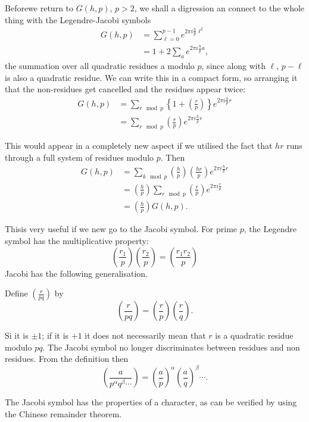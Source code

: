 Before\pageoriginale we return to $G(h, p)$, $p > 2$, we shall a
digression an connect to the whole thing with the Legendre-Jacobi symbols
\begin{align*}
  G(h, p) & = \sum^{p-1}_{\ell=0} e^{2 \pi i \frac{h}{p} \ell^2}\\
  & = 1+ 2 \sum_a e^{2 \pi i \frac{h}{p} a},
\end{align*}
the summation over all quadratic residues a modulo $p$, since along
with $\ell$, $p- \ell$ is also a quadratic residue. We can write this
in a compact form, so arranging it that the non-residues get cancelled
and the residues appear twice:
\begin{align*}
  G(h, p) & = \sum_{r \mod p} \left\{ 1+ \left(
  \frac{r}{p}\right)\right\} e^{ 2\pi i \frac{h}{p}r}\\
  & = \sum_{r \mod p} \left( \frac{r}{p}\right) e^{2 \pi i \frac{h}{p}
  r}
\end{align*}

This would appear in a completely new aspect if we utilised the fact
that $hr$ runs through a full system of residues modulo $p$. Then 
\begin{align*}
  G(h, p) & = \sum_{k \mod p} \left(\frac{h}{p} \right)
  \left(\frac{hr}{p} \right) e^{2 \pi i \frac{h}{p} r}\\
  & = \left(\frac{h}{p} \right) \sum_{r \mod p} \left(\frac{r}{p}
  \right) e^{2 \pi i \frac{r}{p}}\\
  & = \left(\frac{h}{p} \right)  G(h, p).
\end{align*}

This\pageoriginale is very useful if we new go to the Jacobi symbol. For
prime $p$, the Legendre symbol has the multiplicative property:
$$
\left(\frac{r_1}{p} \right) \left(\frac{r_2}{p} \right)=
\left(\frac{r_1 r_2}{p} \right)    
$$
Jacobi has the following generalisation.

Define $\left(\frac{r}{pq} \right) $ by
$$
\left(\frac{r}{pq} \right)= \left(\frac{r}{p} \right)
\left(\frac{r}{q} \right).    
$$

Si it is $\pm 1$; if it is $+1$ it does not necessarily mean that $r$
is a quadratic residue modulo $pq$. The Jacobi symbol no longer
discriminates between residues and non residues. From the definition
then 
$$
\left(\frac{a}{p^\alpha q^\beta \cdots} \right)  = \left(\frac{a}{p}
\right)^\alpha \left(\frac{a}{q} \right)^\beta \cdots.   
$$

The Jacobi symbol has the properties of a character, as can be
verified by using the Chinese remainder theorem.

